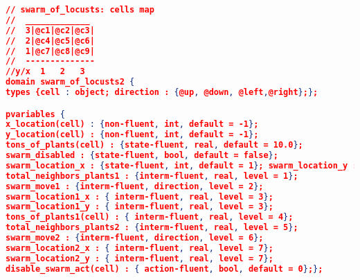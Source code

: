
\bigskip
\bigskip
\bigskip
\bigskip
\bigskip
\bigskip
\bigskip
\bigskip
\DeclareCaptionFormat{}{\hrule} 


\begin{lstlisting}[floatplacement=h,numbersymbol=$:$,language=json,caption={The Locusts Swarm domain in RDDL code.},label={lst:LocustsDomain_RDDL},basicstyle=\tiny]  
// swarm_of_locusts: cells map
//  _____________
//  3|@c1|@c2|@c3|
//  2|@c4|@c5|@c6|
//  1|@c7|@c8|@c9|
//  --------------
//y/x  1   2   3
domain swarm_of_locusts2 {
types {cell : object; direction : {@up, @down, @left,@right};};

pvariables { 
x_location(cell) : {non-fluent, int, default = -1}; 
y_location(cell) : {non-fluent, int, default = -1};
tons_of_plants(cell) : {state-fluent, real, default = 10.0}; 
swarm_disabled : {state-fluent, bool, default = false};
swarm_location_x : {state-fluent, int, default = 1}; swarm_location_y : {state-fluent, int, default = 1}; 
total_neighbors_plants1 : {interm-fluent, real, level = 1}; 
swarm_move1 : {interm-fluent, direction, level = 2};
swarm_location1_x : { interm-fluent, real, level = 3}; 
swarm_location1_y : { interm-fluent, real, level = 3};
tons_of_plants1(cell) : { interm-fluent, real, level = 4}; 
total_neighbors_plants2 : {interm-fluent, real, level = 5};
swarm_move2 : {interm-fluent, direction, level = 6}; 
swarm_location2_x : { interm-fluent, real, level = 7};
swarm_location2_y : { interm-fluent, real, level = 7}; 
disable_swarm_act(cell) : { action-fluent, bool, default = 0};};


\end{lstlisting}

